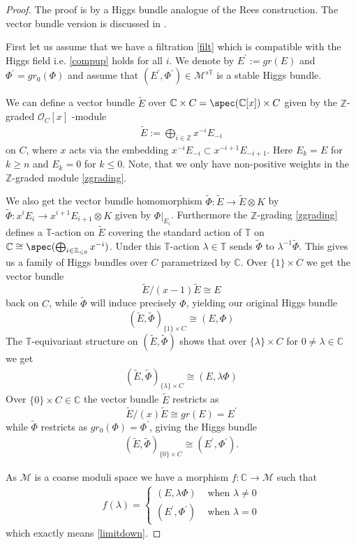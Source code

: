 \documentclass[12pt]{article}
\numberwithin{equation}{section}
\theoremstyle{remark}
\theoremstyle{definition}
\numberwithin{theorem}{section}
\def\beq{\begin{eqnarray}}
\def\eeq{\end{eqnarray}}
\def\C{\mathbb{C}}
\def\M{{\mathcal{M}}}
\newcommand{\T}{{\mathbb{T}}}
\def\calO{{\mathcal O}}
\def\Z{\mathbb{Z}}
\renewcommand{\1}{\mathbbm{1}}
\begin{document}
\begin{proof} The proof is by a Higgs bundle analogue of the Rees construction. The vector bundle version is discussed in \cite{asok,heinloth,halpern}. 
	
	First let us assume that we have a filtration \eqref{filt} which is compatible with the Higgs field i.e. \eqref{compup} holds for all $i$. We denote by $E^\prime:=gr(E)$ and $\Phi^\prime=gr_0(\Phi)$ and assume that $(E^\prime,\Phi^\prime)\in \M^{s\T}$ is a stable Higgs bundle. 
	
	We can define a vector bundle $\tilde{E}$ over $\C\times C=\spec(\C[x])\times C$ given by the $\Z$-graded $\calO_C[x]$ -module \beq \label{zgrading}\tilde{E}:=\bigoplus_{i\in \Z} x^{-i} E_{-i}\eeq on $C$, where $x$ acts via the embedding $x^{-i} E_{-i}\subset x^{-i+1} E_{-i+1}$. Here $E_k=E$ for $k\geq n$ and $E_k=0$ for $k\leq 0$. Note, that we only have non-positive weights in the $\Z$-graded module \eqref{zgrading}.
	
	We also get the vector bundle homomorphism $\tilde{\Phi}:\tilde{E}\to \tilde{E}\otimes K$ by $\tilde{\Phi}:x^i E_i\to x^{i+1} E_{i+1}\otimes K$ given by $\Phi|_{E_i}$. Furthermore the $\Z$-grading \eqref{zgrading} defines a $\T$-action on $\tilde{E}$ covering the standard action of $\T$ on $\C\cong \spec(\bigoplus_{i\in \Z_{\leq 0}} x^{-i})$. Under this $\T$-action $\lambda\in \T$  sends $\tilde{\Phi}$ to $\lambda^{-1}\tilde{\Phi}$. 
	This gives us a family of Higgs bundles over $C$ parametrized by $\C$. Over $\{1\}\times C$ we get the vector bundle $$\tilde{E}/(x-1)\tilde{E}\cong E$$ back on $C$, while $\tilde{\Phi}$  will induce precisely $\Phi$, yielding our original Higgs bundle $$(\tilde{E},\tilde{\Phi})_{\{1\}\times C}\cong (E,\Phi)$$ 
	The $\T$-equivariant structure on $(\tilde{E},\tilde{\Phi})$ shows that over $\{\lambda\}\times C$ for $0\neq\lambda\in\C$ we get \beq\label{etildelambda}(\tilde{E},\tilde{\Phi})_{\{\lambda\}\times C}\cong (E,\lambda\Phi)\eeq Over   $\{0\}\times C\in \C$ the vector bundle $\tilde{E}$ restricts as  $$\tilde{E}/(x)\tilde{E}\cong gr(E)=E^\prime$$ while $\tilde{\Phi}$ restricts as $gr_0(\Phi)=\Phi^\prime$, giving the Higgs bundle \beq\label{etildezero}(\tilde{E},\tilde{\Phi})_{\{0\}\times C}\cong (E^\prime,\Phi^\prime).\eeq
	
	As $\M$ is a coarse moduli space we have a morphism $f:\C\to \M$ such that \beq \label{fdef}f(\lambda)=\left\{\begin{array}{ll} (E,\lambda\Phi)& \mbox{ when } \lambda\neq 0\\ (E^\prime,\Phi^\prime)&\mbox{ when } \lambda=0 \end{array}\right.\eeq which exactly means \eqref{limitdown}.
	

\end{proof}
\end{document}
